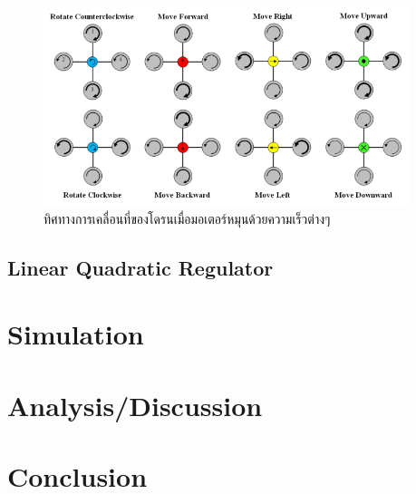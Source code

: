 \documentclass{classes/fiboReport}
\begin{document}
\begin{figure}[ht]
	\centering
	\includegraphics[width=0.95\textwidth]{images/Quadcopter_Movement.png}
	\caption{ทิศทางการเคลื่อนที่ของโดรนเมื่อมอเตอร์หมุนด้วยความเร็วต่างๆ}
	\label{fig:quadroter_movement}
\end{figure}







\clearpage
\section{Linear Quadratic Regulator}


\chapter{Simulation}

\chapter{Analysis/Discussion}
\chapter{Conclusion}


\nocite{*}


\end{document}
